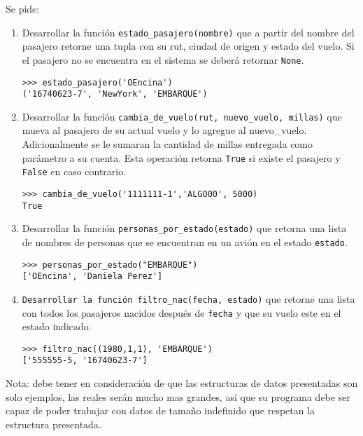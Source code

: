 Se pide:
\begin{enumerate}
\item Desarrollar la función \texttt{estado\_pasajero(nombre)} que a partir del nombre del pasajero retorne una tupla con su rut, ciudad de origen y estado del vuelo. Si el pasajero no se encuentra en el sistema se deberá retornar \texttt{None}.

\begin{lstlisting}[style=consola]
>>> estado_pasajero('OEncina')
('16740623-7', 'NewYork', 'EMBARQUE')
\end{lstlisting}

\item Desarrollar la función \texttt{cambia\_de\_vuelo(rut, nuevo\_vuelo, millas)} que mueva al pasajero de su actual vuelo y lo agregue al nuevo\_vuelo. Adicionalmente se le sumaran la cantidad de millas entregada como parámetro a su cuenta. Esta operación retorna \texttt{True} si existe el pasajero y \texttt{False} en caso contrario.

\begin{lstlisting}[style=consola]
>>> cambia_de_vuelo('1111111-1','ALGO00', 5000)
True
\end{lstlisting}

\item Desarrollar la función \texttt{personas\_por\_estado(estado)} que retorna una lista de nombres de personas que se encuentran en un avión en el estado \texttt{estado}.

\begin{lstlisting}[style=consola]
>>> personas_por_estado("EMBARQUE")
['OEncina', 'Daniela Perez']
\end{lstlisting}

\item \texttt{Desarrollar la función filtro\_nac(fecha, estado)} que retorne una lista con todos los pasajeros nacidos después de \texttt{fecha} y que su vuelo este en el estado indicado.

\begin{lstlisting}[style=consola]
>>> filtro_nac((1980,1,1), 'EMBARQUE')
['555555-5, '16740623-7']
\end{lstlisting}

\end{enumerate}

Nota: debe tener en consideración de que las estructuras de datos presentadas son solo ejemplos, las reales serán mucho mas grandes, así que su programa debe ser capaz de poder trabajar con datos de tamaño indefinido que respetan la estructura presentada.